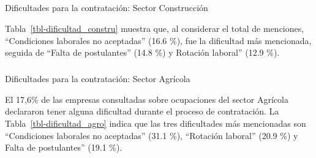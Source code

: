 \documentclass[
  14pt,
]{article}
\makeatletter
\let\oldsubparagraph\subparagraph
\renewcommand{\subparagraph}{
    \@ifstar
      \xxxSubParagraphStar
      \xxxSubParagraphNoStar
  }
\newcommand{\xxxSubParagraphStar}[1]{\oldsubparagraph*{#1}\mbox{}}
\newcommand{\xxxSubParagraphNoStar}[1]{\oldsubparagraph{#1}\mbox{}}
\makeatother
\begin{document}
\subparagraph{Dificultades para la contratación: Sector
Construcción}\label{dificultades-para-la-contrataciuxf3n-sector-construcciuxf3n}

Tabla~\ref{tbl-dificultad_constru} muestra que, al considerar el total
de menciones, ``Condiciones laborales no aceptadas'' (16.6 \%), fue la
dificultad más mencionada, seguida de ``Falta de postulantes'' (14.8 \%)
y Rotación laboral'' (12.9 \%).

\begin{table}

\caption{\label{tbl-dificultad_constru}Dificultades principales de
contratación, ocupaciones del sector Construcción.}


\end{table}%

\subparagraph{Dificultades para la contratación: Sector
Agrícola}\label{dificultades-para-la-contrataciuxf3n-sector-agruxedcola}

El 17,6\% de las empresas consultadas sobre ocupaciones del sector
Agrícola declararon tener alguna dificultad durante el proceso de
contratación. La Tabla~\ref{tbl-dificultad_agro} indica que las tres
dificultades más mencionadas son ``Condiciones laborales no aceptadas''
(31.1 \%), ``Rotación laboral'' (20.9 \%) y Falta de postulantes'' (19.1
\%).
\end{document}
